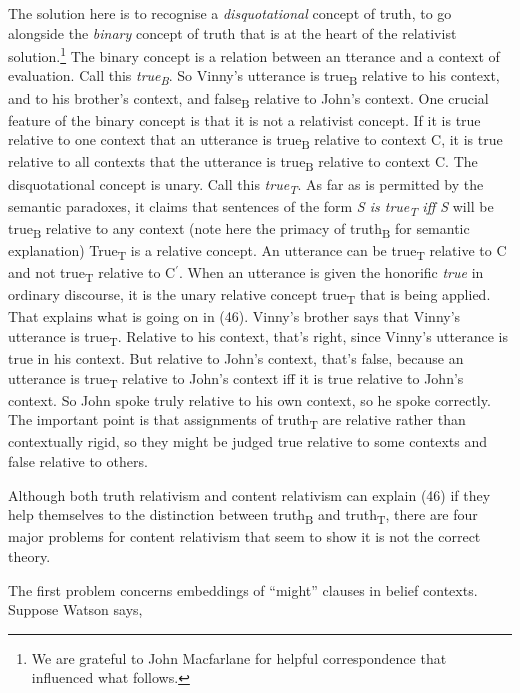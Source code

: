 The solution here is to recognise a \textit{disquotational} concept of truth, to go alongside the \textit{binary} concept of truth that is at the heart of the relativist solution.\footnote{We are grateful to John Macfarlane for helpful correspondence that influenced what follows. } The binary concept is a relation between an tterance and a context of evaluation. Call this \textit{true}\textit{\textsubscript{B}}. So Vinny's utterance is true\textsubscript{B} relative to his context, and to his brother's context, and false\textsubscript{B} relative to John's context. One crucial feature of the binary concept is that it is not a relativist concept. If it is true relative to one context that an utterance is true\textsubscript{B} relative to context C, it is true relative to all contexts that the utterance is true\textsubscript{B} relative to context C. The disquotational concept is unary. Call this \textit{true}\textit{\textsubscript{T}}. As far as is permitted by the semantic paradoxes, it claims that sentences of the form \textit{S is true}\textit{\textsubscript{T}}\textit{ iff S }will be true\textsubscript{B }relative to any context (note here the primacy of truth\textsubscript{B }for semantic explanation) True\textsubscript{T} is a relative concept. An utterance can be true\textsubscript{T} relative to C and not true\textsubscript{T} relative to C\(^\prime\). When an utterance is given the honorific \textit{true} in ordinary discourse, it is the unary relative concept true\textsubscript{T} that is being applied. That explains what is going on in (46). Vinny's brother says that Vinny's utterance is true\textsubscript{T}. Relative to his context, that's right, since Vinny's utterance is true in his context. But relative to John's context, that's false, because an utterance is true\textsubscript{T} relative to John's context iff it is true relative to John's context. So John spoke truly relative to his own context, so he spoke correctly. The important point is that assignments of truth\textsubscript{T} are relative rather than contextually rigid, so they might be judged true relative to some contexts and false relative to others. 
 
Although both truth relativism and content relativism can explain (46) if they help themselves to the distinction between truth\textsubscript{B} and truth\textsubscript{T}, there are four major problems for content relativism that seem to show it is not the correct theory.
 
The first problem concerns embeddings of ``might'' clauses in belief contexts. Suppose Watson says,
 
